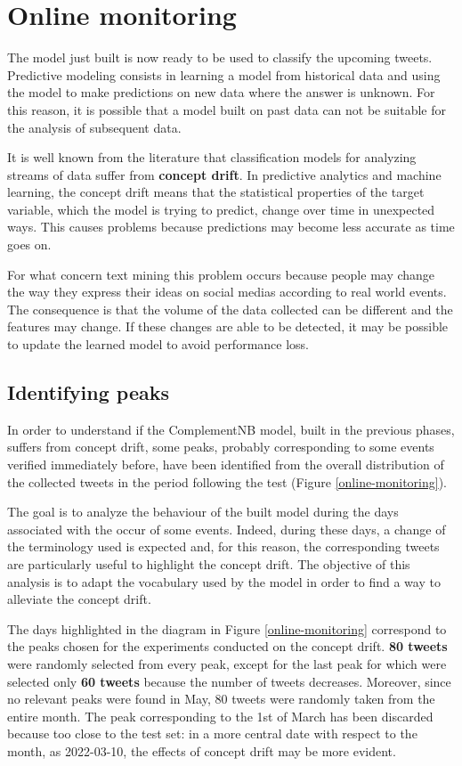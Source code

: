 \section{Online monitoring}

The model just built is now ready to be used to classify the upcoming tweets. Predictive modeling consists in learning a model from historical data and using the model to make predictions on new data where the answer is unknown. For this reason, it is possible that a model built on past data can not be suitable for the analysis of subsequent data.

It is well known from the literature that classification models for analyzing streams of data suffer from \textbf{concept drift}. In predictive analytics and machine learning, the concept drift means that the statistical properties of the target variable, which the model is trying to predict, change over time in unexpected ways. This causes problems because predictions may become less accurate as time goes on.

For what concern text mining this problem occurs because people may change the way they express their ideas on social medias according to real world events. The consequence is that the volume of the data collected can be different and the features may change. 
If these changes are able to be detected, it may be possible to update the learned model to avoid performance loss. 

\subsection{Identifying peaks}

In order to understand if the ComplementNB model, built in the previous phases, suffers from concept drift, some {peaks},  probably corresponding to some events verified immediately before, have been identified from the overall distribution of the collected tweets  in the period following the test (Figure \ref{online-monitoring}). 

The goal is to analyze the behaviour of the built model during the days associated with the occur of some  events. Indeed, during these days, a change of the terminology used is expected and, for this reason, the corresponding tweets are particularly useful to highlight the concept drift. 
The objective of this analysis is to adapt the vocabulary used by the model in order to find a way to alleviate the concept drift.

The days highlighted in the diagram in Figure \ref{online-monitoring} correspond to the peaks chosen for the experiments conducted on the concept drift. \textbf{80 tweets} were randomly selected from every peak, except for the last peak for which were selected only \textbf{60 tweets} because the number of tweets decreases. Moreover, since no relevant peaks were found in May, 80 tweets were randomly taken from the entire month.
The peak corresponding to the 1st of March has been discarded because too close to the test set: in a more central date with respect to the month, as 2022-03-10, the effects of concept drift may be more evident.

